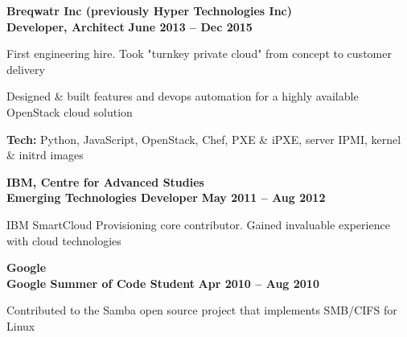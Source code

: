 \documentclass[margin,line]{resume}
\begin{document}
\begin{resume}
    \hspace{-3mm}\textbf{\listing Breqwatr Inc (previously Hyper Technologies Inc)} \vspace{2mm}\\\vspace{1mm}
    \hspace{1.2mm}\textbf{Developer, Architect} \hfill \textbf{June 2013 -- Dec 2015}\vspace{1mm}
    \begin{list2}
        \item First engineering hire. Took "turnkey private cloud" from concept to customer delivery
        \vspace{1mm}
        \item Designed \& built features and devops automation for a highly available OpenStack cloud solution
        \vspace{1mm}
        \item\textbf{Tech:} Python, JavaScript, OpenStack, Chef, PXE \& iPXE, server IPMI, kernel \& initrd images
    \end{list2}

    \hspace{-3mm}\textbf{\listing IBM, Centre for Advanced Studies}\vspace{2mm}\\\vspace{1mm}
    \hspace{1.2mm}\textbf{Emerging Technologies Developer} \hfill \textbf{May 2011 -- Aug 2012}\vspace{1mm}
    \begin{list2}
        \item IBM SmartCloud Provisioning core contributor. Gained invaluable experience with cloud technologies
    \end{list2}

    \hspace{-3mm}\textbf{\listing Google}\vspace{2mm}\\\vspace{1mm}
    \hspace{1.2mm}\textbf{Google Summer of Code Student} \hfill \textbf{Apr 2010 -- Aug 2010}\vspace{1mm}
    \begin{list2}
        \item Contributed to the Samba open source project that implements SMB/CIFS for Linux
    \end{list2}





\end{resume}
\end{document}
